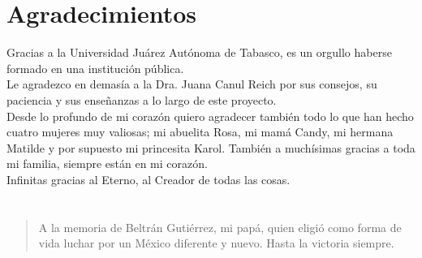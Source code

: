 \chapter*{Agradecimientos}

Gracias a la Universidad Juárez Autónoma de Tabasco, es un orgullo haberse
formado en una institución pública. \\

Le agradezco en demasía a la Dra. Juana Canul Reich por sus consejos, su
paciencia y sus enseñanzas a lo largo de este proyecto. \\

Desde lo profundo de mi corazón quiero agradecer también todo lo que han hecho
cuatro mujeres muy valiosas; mi abuelita Rosa, mi mamá Candy, mi hermana
Matilde y por supuesto mi princesita Karol. También a muchísimas gracias a toda
mi familia, siempre están en mi corazón. \\

Infinitas gracias al Eterno, al Creador de todas las cosas.

\newpage
{}
\chapter*{}

\newenvironment{dedication}
    {\vspace{6ex}
    \begin{quotation}\begin{em}}
    {\par\end{em}
    \end{quotation}}

\begin{dedication}

A la memoria de Beltrán Gutiérrez, mi papá, quien eligió como forma de vida
luchar por un México diferente y nuevo. Hasta la victoria siempre.

\end{dedication}
